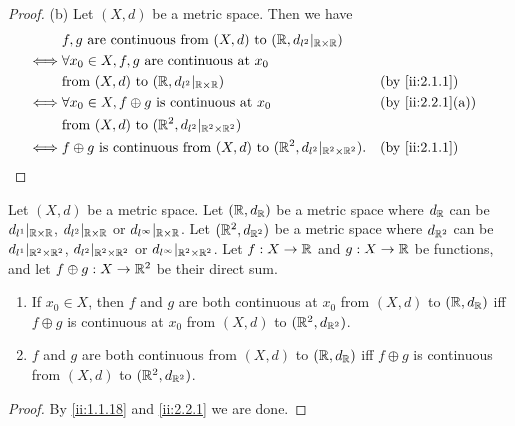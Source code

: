 \begin{proof}{(b)}
  Let \((X, d)\) be a metric space.
  Then we have
  \begin{align*}
         & f, g \text{ are continuous from } (X, d) \text{ to } (\R, d_{l^2}|_{\R \times \R})                                \\
    \iff & \forall x_0 \in X, f, g \text{ are continuous at } x_0                                                            \\
         & \text{from } (X, d) \text{ to } (\R, d_{l^2}|_{\R \times \R})                                  &  & \by{ii:2.1.1}    \\
    \iff & \forall x_0 \in X, f \oplus g \text{ is continuous at } x_0                                    &  & \by{ii:2.2.1}[a] \\
         & \text{from } (X, d) \text{ to } (\R^2, d_{l^2}|_{\R^2 \times \R^2})                                               \\
    \iff & f \oplus g \text{ is continuous from } (X, d) \text{ to } (\R^2, d_{l^2}|_{\R^2 \times \R^2}). &  & \by{ii:2.1.1}
  \end{align*}
\end{proof}

\begin{ac}\label{ii:ac:2.2.1}
  Let \((X, d)\) be a metric space.
  Let \((\mathbb{R}, d_{\mathbb{R}})\) be a metric space where \(d_{\mathbb{R}}\) can be \(d_{l^1}|_{\mathbb{R} \times \mathbb{R}}\), \(d_{l^2}|_{\mathbb{R} \times \mathbb{R}}\) or \(d_{l^\infty}|_{\mathbb{R} \times \mathbb{R}}\).
  Let \((\mathbb{R}^2, d_{\mathbb{R}^2})\) be a metric space where \(d_{\mathbb{R}^2}\) can be \(d_{l^1}|_{\mathbb{R}^2 \times \mathbb{R}^2}\), \(d_{l^2}|_{\mathbb{R}^2 \times \mathbb{R}^2}\) or \(d_{l^\infty}|_{\mathbb{R}^2 \times \mathbb{R}^2}\).
  Let \(f : X \to \mathbb{R}\) and \(g : X \to \mathbb{R}\) be functions, and let \(f \oplus g : X \to \mathbb{R}^2\) be their direct sum.
  \begin{enumerate}
    \item If \(x_0 \in X\), then \(f\) and \(g\) are both continuous at \(x_0\) from \((X, d)\) to \((\mathbb{R}, d_{\mathbb{R}})\) iff \(f \oplus g\) is continuous at \(x_0\) from \((X, d)\) to \((\mathbb{R}^2, d_{\mathbb{R}^2})\).
    \item \(f\) and \(g\) are both continuous from \((X, d)\) to \((\mathbb{R}, d_{\mathbb{R}})\) iff \(f \oplus g\) is continuous from \((X, d)\) to \((\mathbb{R}^2, d_{\mathbb{R}^2})\).
  \end{enumerate}
\end{ac}

\begin{proof}
  By \cref{ii:1.1.18} and \cref{ii:2.2.1} we are done.
\end{proof}

